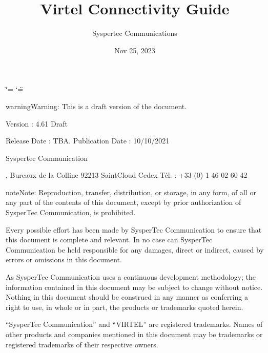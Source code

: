 \documentclass[letterpaper,10pt,english]{sphinxmanual}
\title{Virtel Connectivity Guide}
\date{Nov 25, 2023}
\author{Syspertec Communications}
\begin{document}
\ifdefined\shorthandoff
  \ifnum\catcode`\=\string=\active\shorthandoff{=}\fi
  \ifnum\catcode`\"=\active{}\fi
\fi

\pagestyle{empty}
\sphinxmaketitle
\pagestyle{plain}
\sphinxtableofcontents
\pagestyle{normal}
\label{\detokenize{connectivity_guide::doc}}


\sphinxAtStartPar
{}

\sphinxAtStartPar
{}

\begin{sphinxadmonition}{warning}{Warning:}
\sphinxAtStartPar
This is a draft version of the document.
\end{sphinxadmonition}

\sphinxAtStartPar
Version : 4.61 Draft

\sphinxAtStartPar
Release Date : TBA. Publication Date : 10/10/2021

\sphinxAtStartPar
Syspertec Communication

, Bureaux de la Colline 92213 Saint\sphinxhyphen{}Cloud Cedex Tél. : +33 (0) 1 46 02 60 42

\sphinxAtStartPar
{}

\begin{sphinxadmonition}{note}{Note:}
\sphinxAtStartPar
Reproduction, transfer, distribution, or storage, in any form, of all or any part of
the contents of this document, except by prior authorization of SysperTec
Communication, is prohibited.

\sphinxAtStartPar
Every possible effort has been made by SysperTec Communication to ensure that this document
is complete and relevant. In no case can SysperTec Communication be held responsible for
any damages, direct or indirect, caused by errors or omissions in this document.

\sphinxAtStartPar
As SysperTec Communication uses a continuous development methodology; the information
contained in this document may be subject to change without notice. Nothing in this
document should be construed in any manner as conferring a right to use, in whole or in
part, the products or trademarks quoted herein.

\sphinxAtStartPar
“SysperTec Communication” and “VIRTEL” are registered trademarks. Names of other products
and companies mentioned in this document may be trademarks or registered trademarks of
their respective owners.
\end{sphinxadmonition}
\end{document}

